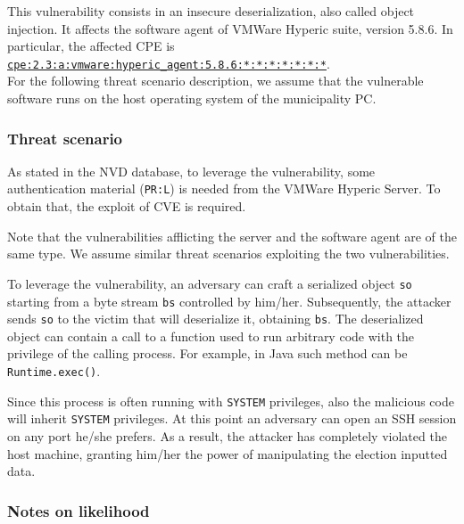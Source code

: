 This vulnerability consists in an insecure deserialization, also called object injection. It affects the software agent of VMWare Hyperic suite, version 5.8.6. In particular, the affected CPE is \\ \href{https://nvd.nist.gov/products/cpe/detail/5976A94C-7191-4547-8205-494B8379A0A3?namingFormat=2.3&orderBy=CPEURI&keyword=cpe%3A2.3%3Aa%3Avmware%3Ahyperic_agent%3A5.8.6%3A*%3A*%3A*%3A*%3A*%3A*%3A*&status=FINAL%2CDEPRECATED}{\texttt{cpe:2.3:a:vmware:hyperic\_agent:5.8.6:*:*:*:*:*:*:*}}.\\

For the following threat scenario description, we assume that the vulnerable software runs on the host operating system of the municipality PC.

\subsubsection*{Threat scenario}

As stated in the NVD database\cite{online:cve-2022-38652}, to leverage the vulnerability, some authentication material (\texttt{PR:L}) is needed from the VMWare Hyperic Server. To obtain that, the exploit of CVE is required.

Note that the vulnerabilities afflicting the server and the software agent are of the same type\cite{online:cve-2022-38650}. We assume similar threat scenarios exploiting the two vulnerabilities.

To leverage the vulnerability, an adversary can craft a serialized object \texttt{so} starting from a byte stream \texttt{bs} controlled by him/her. Subsequently, the attacker sends \texttt{so} to the victim that will deserialize it, obtaining \texttt{bs}. The deserialized object can contain a call to a function used to run arbitrary code with the privilege of the calling process\cite{artile:Java_Deserialization_Remote-Code_Execution}. For example, in Java such method can be \texttt{Runtime.exec()}.

Since this process is often running with \texttt{SYSTEM} privileges\cite{online:cve-2022-38652}, also the malicious code will inherit \texttt{SYSTEM} privileges. At this point an adversary can open an SSH session on any port he/she prefers. As a result, the attacker has completely violated the host machine, granting him/her the power of manipulating the election inputted data.

\subsubsection*{Notes on likelihood}

